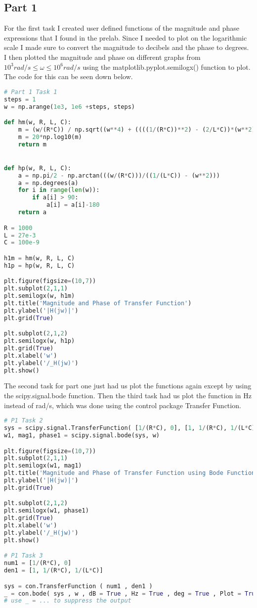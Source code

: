 \documentclass[12pt]{report}
\begin{document}
\subsection{Part 1}
For the first task I created user defined functions of the magnitude and
phase expressions that I found in the prelab. Since I needed to plot on the
logarithmic scale I made sure to convert the magnitude to decibels and
the phase to degrees. I then plotted the magnitude and phase on different
graphs from \begin{math} 10^{3} rad/s \le \omega \le 10^{6} rad/s 
\end{math} using the matplotlib.pyplot.semilogx() function to plot. 
The code for this can be seen down below.
\begin{lstlisting}[language=Python]
# Part 1 Task 1
steps = 1
w = np.arange(1e3, 1e6 +steps, steps)

def hm(w, R, L, C):
    m = (w/(R*C)) / np.sqrt((w**4) + ((((1/(R*C))**2) - (2/L*C))*(w**2)) + ((1/(L*C))**2))
    m = 20*np.log10(m)
    return m


def hp(w, R, L, C):
    a = np.pi/2 - np.arctan(((w/(R*C)))/((1/(L*C)) - (w**2)))
    a = np.degrees(a)
    for i in range(len(w)):
        if a[i] > 90:
            a[i] = a[i]-180
    return a

R = 1000
L = 27e-3
C = 100e-9

h1m = hm(w, R, L, C)
h1p = hp(w, R, L, C)

plt.figure(figsize=(10,7))
plt.subplot(2,1,1)
plt.semilogx(w, h1m)
plt.title('Magnitude and Phase of Transfer Function')                           
plt.ylabel('|H(jw)|')
plt.grid(True)

plt.subplot(2,1,2)
plt.semilogx(w, h1p)
plt.grid(True)
plt.xlabel('w') 
plt.ylabel('/_H(jw)') 
plt.show()
\end{lstlisting}
The second task for part one just had us plot the functions again
except by using the scipy.signal.bode function. Then the third task
had us plot the function in Hz instead of rad/s, which was done using
the control package Transfer Function.
\begin{lstlisting}[language=Python]
# P1 Task 2
sys = scipy.signal.TransferFunction( [1/(R*C), 0], [1, 1/(R*C), 1/(L*C)])
w1, mag1, phase1 = scipy.signal.bode(sys, w)

plt.figure(figsize=(10,7))
plt.subplot(2,1,1)
plt.semilogx(w1, mag1)
plt.title('Magnitude and Phase of Transfer Function using Bode Function')                           
plt.ylabel('|H(jw)|')
plt.grid(True)

plt.subplot(2,1,2)
plt.semilogx(w1, phase1)
plt.grid(True)
plt.xlabel('w') 
plt.ylabel('/_H(jw)') 
plt.show()

# P1 Task 3
num1 = [1/(R*C), 0]
den1 = [1, 1/(R*C), 1/(L*C)]

sys = con.TransferFunction ( num1 , den1 )
_ = con.bode( sys , w , dB = True , Hz = True , deg = True , Plot = True )
# use _ = ... to suppress the output
\end{lstlisting}
\end{document}
